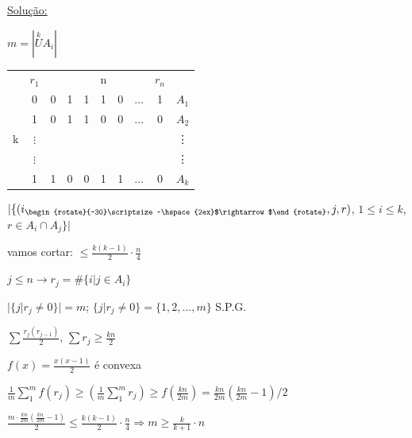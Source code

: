 \documentclass[a4paper,12pt]{article}
\renewcommand{\leq}{\ensuremath{\leqslant}}
\renewcommand{\geq}{\ensuremath{\geqslant}}
\theoremstyle{plain} %
\theoremstyle{definition} %
\theoremstyle{remark} %
\newcommand*\circled[1]{\tikz[baseline=(char.base)]{
		\node[shape=circle,draw,inner sep=2pt] (char) {#1};}}%
\newcommand{\rotsup}[1]{\begin{rotate}{-30}\scriptsize ~#1\end{rotate}}%
\begin{document}
	\begin{framed}
		\vspace{1ex}
		\underline{Solu\c{c}\~ao:}
		
		\circled{3} $m=|\overset{k}{U} A_i|$ \hspace{10em}\begin{tabular}{cccccccccc}
			& $r_1$    &   &   &   & n &   &          & $r_n$                  &       \\ \cline{2-9}
			\multicolumn{1}{c|}{}  & 0        & 0 & 1 & 1 & 1 & 0 & $\dotso$ & \multicolumn{1}{c|}{1} & $A_1$ \\
			\multicolumn{1}{c|}{}  & 1        & 0 & 1 & 1 & 0 & 0 & $\dotso$ & \multicolumn{1}{c|}{0} & $A_2$ \\
			\multicolumn{1}{c|}{k} & $\vdots$  &   &   &   &   &   &          & \multicolumn{1}{c|}{}  & \vdots \\
			\multicolumn{1}{c|}{}  & $\vdots$ &   &   &   &   &   &          & \multicolumn{1}{c|}{}  & \vdots \\
			\multicolumn{1}{c|}{}  & 1        & 1 & 0 & 0 & 1 & 1 & $\dotso$ & \multicolumn{1}{c|}{0} & $A_k$ \\ \cline{2-9}
		\end{tabular}
		
		\vspace{-8ex}
		$|\{(i_{\rotsup{\hspace{2ex}$\rightarrow$}},j,r)$, $1\leq i\leq k$, $r\in A_i\cap A_j\}|$
		
		\hspace{7ex}\scriptsize vamos cortar: $\leq \frac{k(k-1)}{2}\cdot \frac{n}{4}$
		
		\normalsize
		$j\leq n\rightarrow r_j=\#\{i|j\in A_i\}$
		
		\vspace{1ex}
		$|\{j|r_j\neq 0\}|=m$; $\{j|r_j\neq 0\}=\{1,2,\dotso,m\}$ S.P.G.
		
		$\sum \displaystyle\frac{r_j(r_{j-1})}{2}$, $\sum r_j\geq \displaystyle\frac{kn}{2}$
		
		$f(x)=\frac{x(x-1)}{2}$ \'e convexa
		
		$\frac{1}{m}\sum\limits_1^m f(r_j)\geq (\frac{1}{m}\sum\limits_1^m r_j)\geq f(\frac{kn}{2m})=\frac{kn}{2m}(\frac{kn}{2m}-1)/2$
		
		$\frac{m\cdot \frac{kn}{2m}(\frac{kn}{2m}-1)}{2}\leq \frac{k(k-1)}{2}\cdot\frac{n}{4}\Rightarrow m\geq \frac{k}{k+1}\cdot n$ \hspace{2ex} \tiny\textblock
	\end{framed}
	
\end{document}
